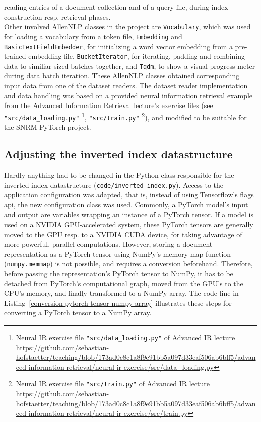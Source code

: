     reading entries of a document collection and of a query file, during index construction resp. 
    retrieval phases.\\
Other involved AllenNLP classes in the project are \texttt{Vocabulary}, which was used for loading 
    a vocabulary from a token file, \texttt{Embedding} and \texttt{BasicTextFieldEmbedder}, 
    for initializing a word vector embedding from a pre-trained embedding file,
    \texttt{BucketIterator}, for iterating, padding and combining data to similiar sized batches together,
    and \texttt{Tqdm}, to show a visual progress meter during data batch iteration.
These AllenNLP classes obtained corresponding input data from one of the dataset readers.
The dataset reader implementation and data handling was based on a provided neural information retrieval 
    example from the Advanced Information Retrieval lecture's exercise files
    (see \texttt{"src/data\_loading.py"}
    \footnote{Neural IR exercise file \texttt{"src/data\_loading.py"} of Advanced IR lecture \url{https://github.com/sebastian-hofstaetter/teaching/blob/173ad0c8c1a8f9e91bb5a097d33eaf506ab6bff5/advanced-information-retrieval/neural-ir-exercise/src/data_loading.py}},
    \texttt{"src/train.py"}
    \footnote{Neural IR exercise file \texttt{"src/train.py"} of Advanced IR lecture \url{https://github.com/sebastian-hofstaetter/teaching/blob/173ad0c8c1a8f9e91bb5a097d33eaf506ab6bff5/advanced-information-retrieval/neural-ir-exercise/src/train.py}}),
    and modified to be suitable for the SNRM PyTorch project.

\subsection{Adjusting the inverted index datastructure}
Hardly anything had to be changed in the Python class responsible for the inverted index datastructure 
    (\texttt{code/inverted\_index.py}).
Access to the application configuration was adapted, that is, instead of using Tensorflow's flags api, the 
    new configuration class was used.
Commonly, a PyTorch model's input and output are variables wrapping an instance of a PyTorch tensor.
If a model is used on a NVIDIA GPU-accelerated system, these PyTorch tensors are generally moved to 
    the GPU resp. to a NVIDIA CUDA device, for taking advantage of more powerful, parallel computations.
However, storing a document representation as a PyTorch tensor using NumPy's memory map function 
    (\texttt{numpy.memmap}) is not possible, and requires a conversion beforehand.
Therefore, before passing the representation's PyTorch tensor to NumPy, 
    it has to be detached from PyTorch's computational graph,
    moved from the GPU's to the CPU's memory, and finally transformed to a NumPy array.
The code line in Listing~\ref{conversion-pytorch-tensor-numpy-array} illustrates these steps 
    for converting a PyTorch tensor to a NumPy array.

